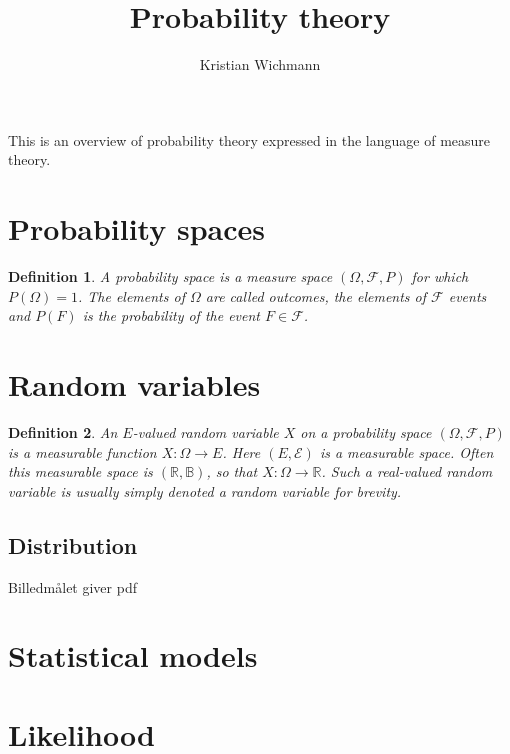 \documentclass[12pt, a4paper]{article}
\title{Probability theory}
\author{Kristian Wichmann}
\newtheorem{definition}{Definition}[section]
\begin{document}
\maketitle

This is an overview of probability theory expressed in the language of measure theory.

\section{Probability spaces}
\begin{definition}
A probability space is a measure space $(\Omega, \mathcal{F}, P)$ for which $P(\Omega)=1$. The elements of $\Omega$ are called outcomes, the elements of $\mathcal{F}$ events and $P(F)$ is the probability of the event $F\in\mathcal{F}$.
\end{definition}

\section{Random variables}
\begin{definition}
An $E$-valued random variable $X$ on a probability space $(\Omega, \mathcal{F}, P)$ is a measurable function $X: \Omega\rightarrow E$. Here $(E,\mathcal{E})$ is a measurable space. Often this measurable space is $(\mathbb{R},\mathbb{B})$, so that $X: \Omega\rightarrow\mathbb{R}$. Such a real-valued random variable is usually simply denoted a random variable for brevity.
\end{definition}


\subsection{Distribution}
Billedmålet giver pdf

\section{Statistical models}

\section{Likelihood}
\end{document}
